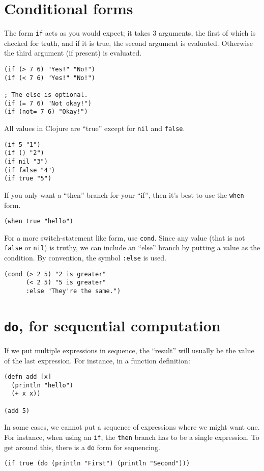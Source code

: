 \documentclass[11pt]{article}
\begin{document}
\section{Conditional forms}
\label{sec:org539be4d}
The form \texttt{if} acts as you would expect; it takes 3 arguments,
the first of which is checked for truth,
and if it is true, the second argument is evaluated.
Otherwise the third argument (if present) is evaluated.
\begin{verbatim}
(if (> 7 6) "Yes!" "No!")
(if (< 7 6) "Yes!" "No!")

; The else is optional.
(if (= 7 6) "Not okay!")
(if (not= 7 6) "Okay!")
\end{verbatim}

All values in Clojure are “true” except for \texttt{nil} and \texttt{false}.
\begin{verbatim}
(if 5 "1")
(if () "2")
(if nil "3")
(if false "4")
(if true "5")
\end{verbatim}

If you only want a “then” branch for your “if”,
then it's best to use the \texttt{when} form.
\begin{verbatim}
(when true "hello")
\end{verbatim}

For a more switch-statement like form, use \texttt{cond}.
Since any value (that is not \texttt{false} or \texttt{nil}) is truthy,
we can include an “else” branch by putting a value
as the condition. By convention, the symbol \texttt{:else} is used.
\begin{verbatim}
(cond (> 2 5) "2 is greater"
      (< 2 5) "5 is greater"
      :else "They're the same.")
\end{verbatim}

\section{\texttt{do}, for sequential computation}
\label{sec:org7684b00}
If we put multiple expressions in sequence,
the “result” will usually be the value of the last expression.
For instance, in a function definition:
\begin{verbatim}
(defn add [x]
  (println "hello")
  (+ x x))

(add 5)
\end{verbatim}

In some cases, we cannot put a sequence of expressions
where we might want one. For instance, when using an \texttt{if},
the \texttt{then} branch has to be a single expression.
To get around this, there is a \texttt{do} form for sequencing.
\begin{verbatim}
(if true (do (println "First") (println "Second")))
\end{verbatim}
\end{document}
